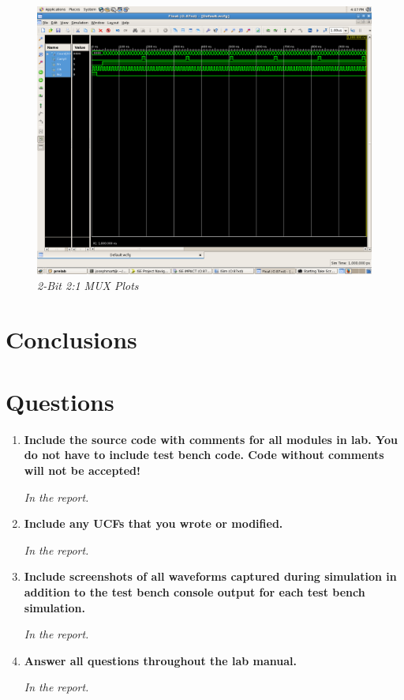 \documentclass[a4paper,12pt]{article}
\begin{document}
\begin{figure}[h]
  \begin{center}
    \includegraphics[scale=.1]{up_Count_waveform.png}
    \caption{\textit{2-Bit 2:1 MUX Plots}}
  \end{center}
\end{figure}

\section*{Conclusions}


\section*{Questions}

\begin{enumerate}
  \item \textbf{Include the source code with comments for all modules in lab. You do not have to include test bench
  code. Code without comments will not be accepted!}

  \textit{In the report.}
  
  \item \textbf{Include any UCFs that you wrote or modified.}

  \textit{In the report.}
  
  \item \textbf{Include screenshots of all waveforms captured during simulation in addition to the test bench console
  output for each test bench simulation.}

  \textit{In the report.}

  \item \textbf{Answer all questions throughout the lab manual.}

  \textit{In the report.}
  
\end{enumerate}
\end{document}
